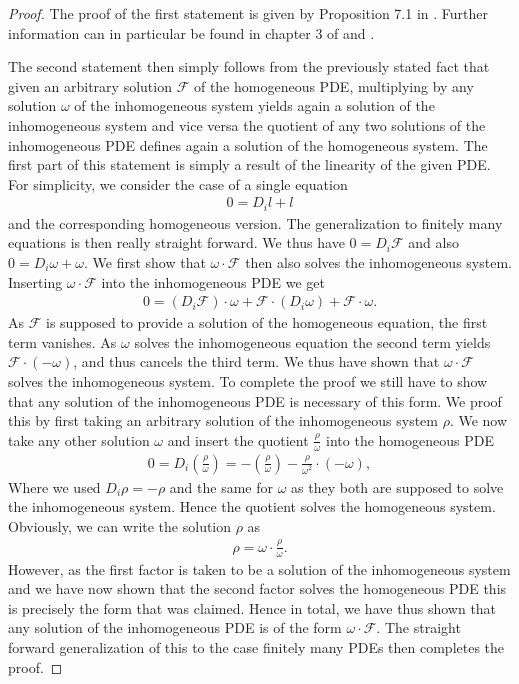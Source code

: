 \documentclass[a4paper,12pt, DIV=14, BCOR=5mm, twoside, headsepline, numbers=noenddot]{scrbook}
\begin{document}
\begin{proof}
The proof of the first statement is given by Proposition 7.1 in \cite{seiler1994analysis}. Further information can in particular be found in chapter 3 of \cite{seiler2009involution} and \cite{articleCH}. 

The second statement then simply follows from the previously stated fact that given an arbitrary solution $\mathcal{F}$ of the homogeneous PDE, multiplying by any solution $\omega$ of the inhomogeneous system yields again a solution of the inhomogeneous system and vice versa the quotient of any two solutions of the inhomogeneous PDE defines again a solution of the homogeneous system. The first part of this statement is simply a result of the linearity of the given PDE. For simplicity, we consider the case of a single equation 
\begin{align}
    0=D_i l + l 
\end{align}
and the corresponding homogeneous version. The generalization to finitely many equations is then really straight forward. 
We thus have $0 = D_i \mathcal{F}$ and also $0 = D_i \omega + \omega$.
We first show that $\omega \cdot \mathcal{F}$ then also solves the inhomogeneous system. Inserting $\omega \cdot \mathcal{F}$ into the inhomogeneous PDE we get  
\begin{align}
    0 = \left ( D_i \mathcal{F} \right ) \cdot \omega + \mathcal{F} \cdot \left ( D_i \omega \right) + \mathcal{F} \cdot \omega. 
\end{align}
As $\mathcal{F}$ is supposed to provide a solution of the homogeneous equation, the first term vanishes. As $\omega$ solves the inhomogeneous equation the second term yields $\mathcal{F} \cdot \left ( - \omega \right )$,
and thus cancels the third term. We thus have shown that $\omega \cdot \mathcal{F}$ solves the inhomogeneous system. To complete the proof we still have to show that any solution of the inhomogeneous PDE is necessary of this form. We proof this by first taking an arbitrary solution of the inhomogeneous system $\rho$. We now take any other solution $\omega$ and insert the quotient $\frac{\rho}{\omega}$ into the homogeneous PDE
\begin{align}
    0 = D_i \left (\frac{\rho}{\omega} \right) = - (\frac{\rho}{\omega}) - \frac{\rho}{\omega^2} \cdot (-\omega) ,
\end{align}
Where we used $D_i \rho = -\rho$ and the same for $\omega$ as they both are supposed to solve the inhomogeneous system. Hence the quotient solves the homogeneous system. Obviously, we can write the solution $\rho$ as 
\begin{align}
    \rho = \omega \cdot  \frac{\rho}{\omega}.
\end{align}
However, as the first factor is taken to be a solution of the inhomogeneous system and we have now shown that the second factor solves the homogeneous PDE this is precisely the form that was claimed. 
Hence in total, we have thus shown that any solution of the inhomogeneous PDE is of the form $\omega \cdot \mathcal{F}$.
The straight forward generalization of this to the case finitely many PDEs then completes the proof.
\end{proof}
\end{document}
